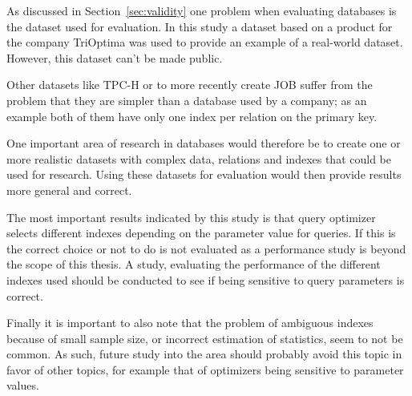 As discussed in Section~\ref{sec:validity} one problem when evaluating
databases is the dataset used for evaluation. In this study a dataset based on a
product for the company TriOptima was used to provide an example of a real-world
dataset. However, this dataset can't be made public.

Other datasets like TPC-H or to more recently create JOB suffer from the problem
that they are simpler than a database used by a company; as an example both of
them have only one index per relation on the primary key.

One important area of research in databases would therefore be to create one or
more realistic datasets with complex data, relations and indexes that could be
used for research. Using these datasets for evaluation would then provide
results more general and correct.

The most important results indicated by this study is that query optimizer
selects different indexes depending on the parameter value for queries. If this
is the correct choice or not to do is not evaluated as a performance study is
beyond the scope of this thesis. A study, evaluating the performance of the
different indexes used should be conducted to see if being sensitive to query
parameters is correct.

Finally it is important to also note that the problem of ambiguous indexes
because of small sample size, or incorrect estimation of statistics, seem to not
be common. As such, future study into the area should probably avoid this topic
in favor of other topics, for example that of optimizers being sensitive to
parameter values.